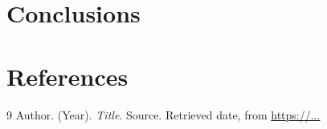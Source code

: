 \documentclass[12pt, a4paper]{article}
\begin{document}
\section{Conclusions}
\noindent

\renewcommand{\refname}{}
\section{References}
\vspace{-2em}
\begin{thebibliography}{9}
Author. (Year). \textit{Title}. Source. Retrieved date, from \url{https://...}
\end{thebibliography}
\end{document}
